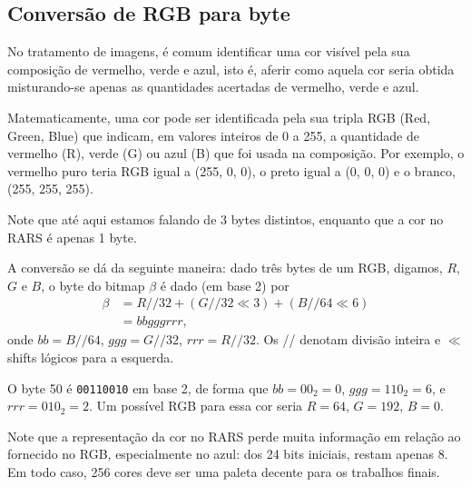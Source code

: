 \documentclass[10pt, a4paper, twoside]{article}
\begin{document}
    \subsection{Conversão de RGB para byte}
      No tratamento de imagens, é comum identificar uma cor visível pela sua composição de vermelho, verde e azul, isto é, aferir como aquela cor seria obtida misturando-se apenas as quantidades acertadas de vermelho, verde e azul.
      
      Matematicamente, uma cor pode ser identificada pela sua tripla RGB (Red, Green, Blue) que indicam, em valores inteiros de 0 a 255, a quantidade de vermelho (R), verde (G) ou azul (B) que foi usada na composição.
      Por exemplo, o vermelho puro teria RGB igual a (255, 0, 0), o preto igual a (0, 0, 0) e o branco, (255, 255, 255).
      
      Note que até aqui estamos falando de 3 bytes distintos, enquanto que a cor no RARS é apenas 1 byte.
      
      A conversão se dá da seguinte maneira:
      dado três bytes de um RGB, digamos, $R$, $G$ e $B$, o byte do bitmap $\beta$ é dado (em base 2) por
      \begin{align}
        \beta &= R/\!\!/32 + 
                 (G/\!\!/32 \ll 3) + 
                 (B/\!\!/64 \ll 6)      \label{eq:byte}\\
          &= bbgggrrr,                  \nonumber
      \end{align}
      onde 
      $bb=B/\!\!/64$,
      $ggg=G/\!\!/32$,
      $rrr=R/\!\!/32$.
      Os /\!\!/ denotam divisão inteira e $\ll$ shifts lógicos para a esquerda.
      \begin{exemplo}
        O byte 50 é {\tt 00110010} em base 2, de forma que 
        $bb=00_2=0$,
        $ggg=110_2=6$, e
        $rrr=010_2=2$.
        Um possível RGB para essa cor seria
        $R=64$, $G=192$, $B=0$.
      \end{exemplo}
      Note que a representação da cor no RARS perde muita informação em relação ao fornecido no RGB, especialmente no azul: dos 24 bits iniciais, restam apenas 8.
      Em todo caso, 256 cores deve ser uma paleta decente para os trabalhos finais.
      
\end{document}
